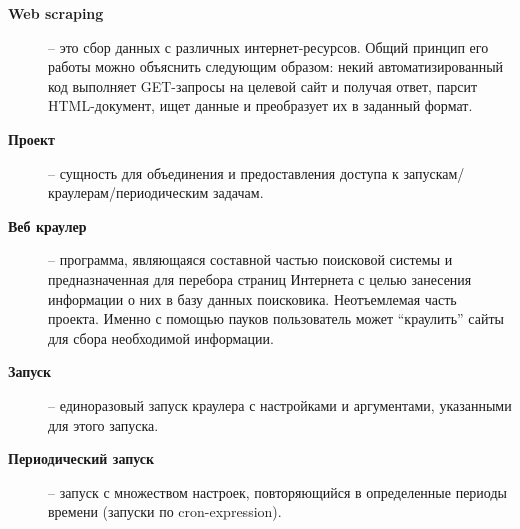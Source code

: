 \begin{description}
		\item[\textbf{Web scraping}] -- это сбор данных с различных интернет-ресурсов. Общий принцип его работы можно объяснить следующим образом: некий автоматизированный код выполняет GET-запросы на целевой сайт и получая ответ, парсит HTML-документ, ищет данные и преобразует их в заданный формат. \label{terms:webscraping}
		\item[\textbf{Проект}] -- сущность для объединения и предоставления доступа к запускам/краулерам/периодическим задачам. \label{terms:project}
		
		\item[\textbf{Веб краулер}] --  программа, являющаяся составной частью поисковой системы и предназначенная для перебора страниц Интернета с целью занесения информации о них в базу данных поисковика. Неотъемлемая часть проекта. Именно с помощью пауков пользователь может “краулить” сайты для сбора необходимой информации. \label{terms:spider}
		\item[\textbf{Запуск}] -- единоразовый запуск краулера с настройками и аргументами, указанными для этого запуска. \label{terms:job}
		\item[\textbf{Периодический запуск}] -- запуск с множеством настроек, повторяющийся в определенные периоды времени (запуски по cron-expression).
		\label{terms:pjob}
	\end{description}